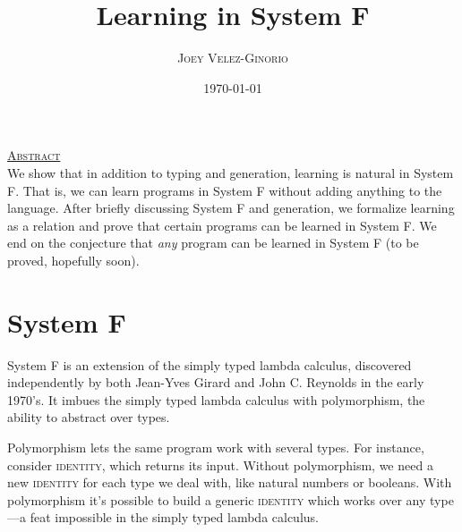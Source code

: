 \documentclass[11pt]{article}
\title{\huge Learning in System F}
\author{\textsc{Joey Velez-Ginorio} \vspace{0.2cm}}
\date{\small\today}
\makeatletter
\renewenvironment{abstract}
    {\begin{adjustwidth}{1.0em}{1.0em}\underline{\textsc{Abstract}}\\}
    {\end{adjustwidth}}
\theoremstyle{mytheoremstyle}
\renewcommand{\maketitle}{\bgroup\setlength{\parindent}{0pt}
\begin{flushleft}
  \textbf{\@title}

  \@author
  
  \textit{\@date}
\end{flushleft}\egroup
}
\makeatother
\begin{document}
\maketitle

\begin{abstract}
We show that in addition to typing and generation, learning is natural in System F. That is, we can learn programs in System F without adding anything to the language. After briefly discussing System F and generation, we formalize learning as a relation and prove that certain programs can be learned in System F. We end on the conjecture that \textit{any} program can be learned in System F (to be proved, hopefully soon).
\end{abstract}

\section{System F}
System F is an extension of the simply typed lambda calculus, discovered independently by both Jean-Yves Girard and John C. Reynolds in the early 1970's. It imbues the simply typed lambda calculus with polymorphism, the ability to abstract over types. 

Polymorphism lets the same program work with several types. For instance, consider \textsc{identity}, which returns its input. Without polymorphism, we need a new \textsc{identity} for each type we deal with, like natural numbers or booleans. With polymorphism it's possible to build a generic \textsc{identity} which works over any type---a feat impossible in the simply typed lambda calculus.\\
\end{document}
